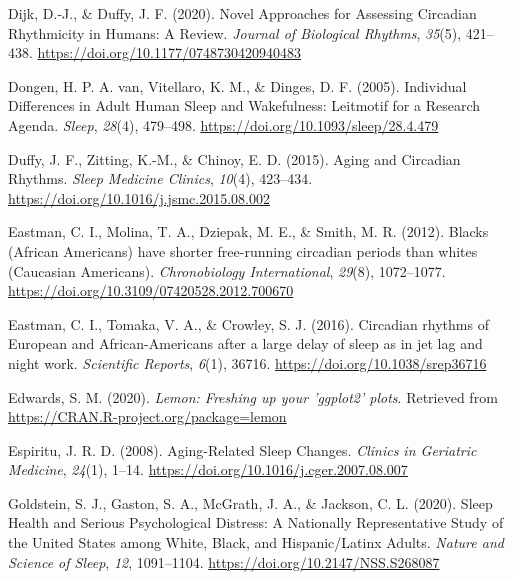 \documentclass[
  english,
  jou,floatsintext]{apa6}
\newlength{\cslhangindent}
\newenvironment{CSLReferences}[2] %
 {%
  \setlength{\parindent}{0pt}
  \ifodd #1 \everypar{\setlength{\hangindent}{\cslhangindent}}\ignorespaces\fi
  \ifnum #2 > 0
  \setlength{\parskip}{#2\baselineskip}
  \fi
 }%
 {}
\begin{document}
\begin{CSLReferences}{1}{0}
\leavevmode{}%
Dijk, D.-J., \& Duffy, J. F. (2020). Novel {Approaches} for {Assessing} {Circadian} {Rhythmicity} in {Humans}: {A} {Review}. \emph{Journal of Biological Rhythms}, \emph{35}(5), 421--438. \url{https://doi.org/10.1177/0748730420940483}

\leavevmode{}%
Dongen, H. P. A. van, Vitellaro, K. M., \& Dinges, D. F. (2005). Individual {Differences} in {Adult} {Human} {Sleep} and {Wakefulness}: {Leitmotif} for a {Research} {Agenda}. \emph{Sleep}, \emph{28}(4), 479--498. \url{https://doi.org/10.1093/sleep/28.4.479}

\leavevmode{}%
Duffy, J. F., Zitting, K.-M., \& Chinoy, E. D. (2015). Aging and {Circadian} {Rhythms}. \emph{Sleep Medicine Clinics}, \emph{10}(4), 423--434. \url{https://doi.org/10.1016/j.jsmc.2015.08.002}

\leavevmode{}%
Eastman, C. I., Molina, T. A., Dziepak, M. E., \& Smith, M. R. (2012). Blacks ({African} {Americans}) have shorter free-running circadian periods than whites ({Caucasian} {Americans}). \emph{Chronobiology International}, \emph{29}(8), 1072--1077. \url{https://doi.org/10.3109/07420528.2012.700670}

\leavevmode{}%
Eastman, C. I., Tomaka, V. A., \& Crowley, S. J. (2016). Circadian rhythms of {European} and {African}-{Americans} after a large delay of sleep as in jet lag and night work. \emph{Scientific Reports}, \emph{6}(1), 36716. \url{https://doi.org/10.1038/srep36716}

\leavevmode{}%
Edwards, S. M. (2020). \emph{Lemon: Freshing up your 'ggplot2' plots}. Retrieved from \url{https://CRAN.R-project.org/package=lemon}

\leavevmode{}%
Espiritu, J. R. D. (2008). Aging-{Related} {Sleep} {Changes}. \emph{Clinics in Geriatric Medicine}, \emph{24}(1), 1--14. \url{https://doi.org/10.1016/j.cger.2007.08.007}

\leavevmode{}%
Goldstein, S. J., Gaston, S. A., McGrath, J. A., \& Jackson, C. L. (2020). Sleep {Health} and {Serious} {Psychological} {Distress}: {A} {Nationally} {Representative} {Study} of the {United} {States} among {White}, {Black}, and {Hispanic}/{Latinx} {Adults}. \emph{Nature and Science of Sleep}, \emph{12}, 1091--1104. \url{https://doi.org/10.2147/NSS.S268087}


\end{CSLReferences}
\end{document}
